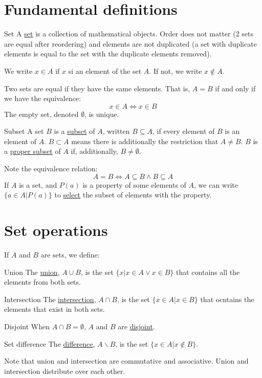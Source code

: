 \documentclass[../Main.tex]{subfiles}
\begin{document}
\section{Fundamental definitions}
\begin{definition}{Set}
    A \underline{set} is a collection of mathematical objects. Order does not matter (2 sets are equal after reordering) and elements are not duplicated (a set with duplicate elements is equal to the set with the duplicate elements removed).
\end{definition}
We write $x \in A$ if $x$ si an element of the set $A$. If not, we write $x \notin A$.\par
Two sets are equal if they have the same elements. That is, $A = B$ if and only if we have the equivalence:
\begin{equation*}
    x \in A \Leftrightarrow x \in B
\end{equation*}
The empty set, denoted $\emptyset$, is unique.
\begin{definition}{Subset}
    A set $B$ is a \underline{subset} of $A$, written $B \subseteq A$, if every element of $B$ is an element of $A$. $B \subset A$ means there is additionally the restriction that $A \neq B$. $B$ is a \underline{proper subset} of $A$ if, additionally, $B \neq \emptyset$.
\end{definition}
Note the equivalence relation:
\begin{equation*}
    A = B \Leftrightarrow A \subseteq B \land B \subseteq A
\end{equation*}
If $A$ is a set, and $P(a)$ is a property of some elements of $A$, we can write $\{a \in A | P(a)\}$ to \underline{select} the subset of elements with the property.
\section{Set operations}
If $A$ and $B$ are sets, we define:
\begin{definition}{Union}
    The \underline{union}, $A \cup B$, is the set $\{x | x \in A \lor x \in B\}$ that contains all the elements from both sets.
\end{definition}
\begin{definition}{Intersection}
    The \underline{intersection}, $A \cap B$, is the set $\{x \in A | x \in B\}$ that ocntains the elements that exist in both sets.
\end{definition}
\begin{definition}{Disjoint}
    When $A \cap B = \emptyset$, $A$ and $B$ are \underline{disjoint}.
\end{definition}
\begin{definition}{Set difference}
    The \underline{difference}, $A \backslash B$, is the set $\{x \in A | x \notin B\}$.
\end{definition}
Note that union and intersection are commutative and associative. Union and intersection distribute over each other.
\end{document}
